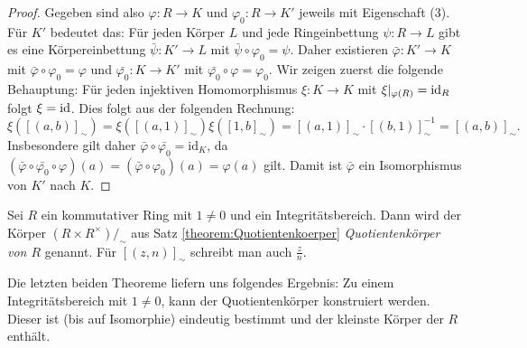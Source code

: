 \begin{proof}
    Gegeben sind also $\varphi:R\to K$ und $\varphi_0:R\to K'$ jeweils mit Eigenschaft (3). Für $K'$ bedeutet das: Für jeden Körper $L$ und jede Ringeinbettung $\psi:R\to L$ gibt es eine Körpereinbettung $\bar{\psi}:K'\to L$ mit $\bar{\psi}\circ\varphi_0=\psi$.
    Daher existieren $\bar{\varphi}:K'\to K$ mit $\bar{\varphi}\circ \varphi_0=\varphi$ und $\bar{\varphi_0}:K\to K'$ mit $\bar{\varphi_0}\circ \varphi=\varphi_0$. Wir zeigen zuerst die folgende Behauptung: Für jeden injektiven Homomorphismus
    $\xi:K\to K$ mit $\xi|_{\varphi(R)}=\operatorname{id}_R$ folgt $\xi=\operatorname{id}$. Dies folgt aus der folgenden Rechnung:
    $$
        \xi([(a,b)]_\sim)=\xi([(a,1)]_\sim)\xi([1,b]_\sim)=[(a,1)]_\sim\cdot [(b,1)]_\sim^{-1}=[(a,b)]_\sim.
    $$
    Insbesondere gilt daher $\bar{\varphi}\circ \bar{\varphi_0}=\mathrm{id}_K$, da $(\bar{\varphi}\circ\bar{\varphi_0}\circ\varphi)(a)=(\bar{\varphi}\circ\varphi_0)(a)=\varphi(a)$ gilt. Damit ist $\bar{\varphi}$ ein Isomorphismus von $K'$ nach $K$.
\end{proof}

\begin{definition}
    Sei $R$ ein kommutativer Ring mit $1\neq 0$ und ein Integritätsbereich. Dann wird der Körper
    $(R\times R^\times)/_\sim$ aus Satz \ref{theorem:Quotientenkoerper} \emph{Quotientenk\"orper von $R$} genannt.
    Für $[(z,n)]_\sim$ schreibt man auch $\frac{z}{n}$.
\end{definition}

\begin{remark}
    Die letzten beiden Theoreme liefern uns folgendes Ergebnis: Zu einem Integritätsbereich mit $1\neq 0$, kann der Quotientenk\"orper konstruiert werden. Dieser ist (bis auf Isomorphie) eindeutig bestimmt und der kleinste Körper
    der $R$ enthält.
\end{remark}

